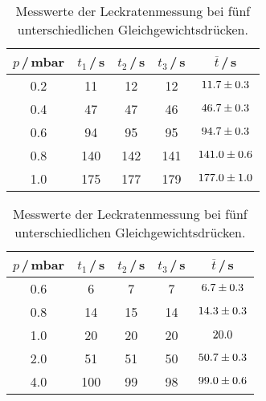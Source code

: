 \begin{table}[H]
  \caption{Messwerte der Leckratenmessung bei fünf unterschiedlichen Gleichgewichtsdrücken.}
  \begin{subtable}{0.45\textwidth}
    \begin{tabular}{c|c|c|c|c}\label{tab:Leck0.1Dreh}
      $p$\,/\,mbar & $t_1$\,/\,s & $t_2$\,/\,s & $t_3$\,/\,s & $\overline{t}$\,/\,s \\
      \midrule
      0.2 & 11  & 12  & 12  & $\num{11.7 +- 0.3}$ \\
      0.4 & 47  & 47  & 46  & $\num{46.7 +- 0.3}$ \\
      0.6 & 94  & 95  & 95  & $\num{94.7 +- 0.3}$ \\
      0.8 & 140 & 142 & 141 & $\num{141.0 +- 0.6}$ \\
      1.0 & 175 & 177 & 179 & $\num{177.0 +- 1.0}$ \\
    \end{tabular}
  \end{subtable}\hfill
  \begin{subtable}{0.45\textwidth}
    \begin{tabular}{c|c|c|c|c}\label{tab:Leck0.4Dreh}
      $p$\,/\,mbar & $t_1$\,/\,s & $t_2$\,/\,s & $t_3$\,/\,s & $\overline{t}$\,/\,s \\
      \midrule
      0.6 & 6   & 7  & 7  & $\num{6.7 +- 0.3}$ \\
      0.8 & 14  & 15 & 14 & $\num{14.3 +- 0.3}$ \\
      1.0 & 20  & 20 & 20 & $\num{20.0 +- 0.0}$ \\
      2.0 & 51  & 51 & 50 & $\num{50.7 +- 0.3}$ \\
      4.0 & 100 & 99 & 98 & $\num{99.0 +- 0.6}$ \\
    \end{tabular}
  \end{subtable}

  \vspace{1cm}


\end{table}
